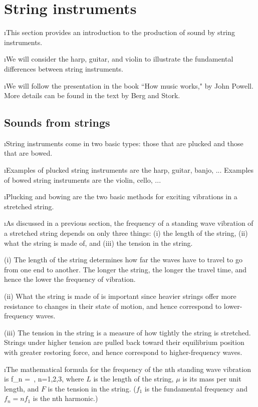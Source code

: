\section{String instruments}
\bi

\i This section provides an introduction to 
the production of sound by string instruments.

\i We will consider the harp, guitar, and violin
to illustrate the fundamental differences between
string instruments.

\i We will follow the presentation in the book 
``How music works," by John Powell.
More details can be found in the text by Berg and Stork.

\ei
\subsection{Sounds from strings}
\bi

\i String instruments come in two basic types: 
those that are plucked and those that are bowed.

\i Examples of plucked string instruments are the 
harp, guitar, banjo, ...
Examples of bowed string instruments are the 
violin, cello, ...

\i Plucking and bowing are the two basic 
methods for exciting vibrations in a stretched string.

\i As discussed in a previous section,
the frequency of a standing wave vibration of a 
stretched string depends on only three things:
(i) the length of the string, 
(ii) what the string is made of, and
(iii) the tension in the string.

(i) The length of the string determines how far
the waves have to travel to go from one end to
another.
The longer the string, the longer the travel
time, and hence the lower the frequency of vibration.

(ii) What the string is made of is important 
since heavier strings offer more resistance 
to changes in their state of motion, and hence 
correspond to lower-frequency waves.

(iii) The tension in the string is a measure of 
how tightly the string is stretched.
Strings under higher tension are pulled back toward
their equilibrium position with greater restoring
force, and hence correspond to higher-frequency waves.

\i The mathematical formula for the frequency
of the nth standing wave vibration is
%
\be
f_n = \,,
\qquad
n=1,2,3,\cdots
\ee
%
where $L$ is the length of the string,
$\mu$ is its mass per unit length, and 
$F$ is the tension in the string.
($f_1$ is the fundamental frequency and 
$f_n = nf_1$ is the nth harmonic.)

